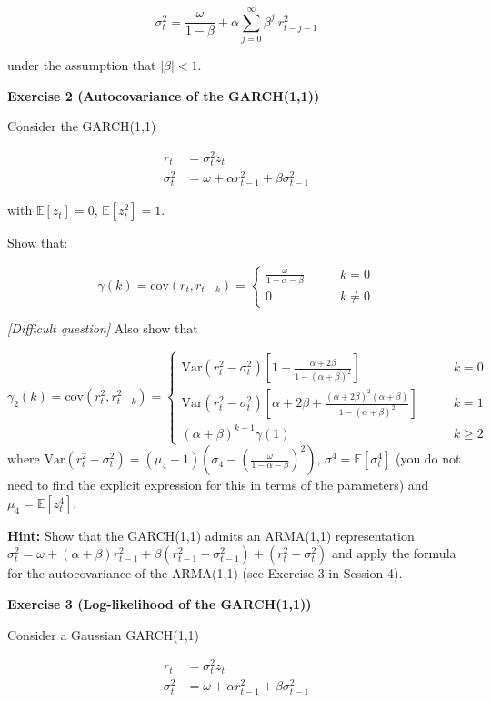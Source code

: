 \documentclass[
]{book}
\begin{document}
\[
\sigma^2_t = \frac{\omega}{1-\beta} + \alpha \sum_{j=0}^\infty \beta^j \ r^2_{t-j-1}
\]

under the assumption that \(|\beta| < 1\).

\textbf{Exercise 2 (Autocovariance of the GARCH(1,1))}

Consider the GARCH(1,1)

\[
\begin{aligned}
r_t &= \sigma^2_t z_t \\[1ex]
\sigma^2_t &= \omega + \alpha r_{t-1}^2 + \beta \sigma^2_{t-1}
\end{aligned}
\]

with \(\mathbb{E}[z_t] = 0\), \(\mathbb{E}[z^2_t] = 1\).

Show that:

\[
\gamma(k) = \text{cov}(r_t, r_{t-k}) = 
\begin{cases}
\frac{\omega}{1-\alpha-\beta}  \qquad  & k = 0 \\
0 & k \neq 0
\end{cases}
\]

\emph{{[}Difficult question{]}} Also show that

\[
\gamma_2(k) = \text{cov}(r^2_t, r^2_{t-k}) = 
\begin{cases}
\text{Var}(r^2_t - \sigma^2_t)\left[1+\frac{\alpha+2\beta}{1-(\alpha+\beta)^2}\right] \qquad  & k = 0 \\[1em]
\text{Var}(r^2_t - \sigma^2_t)\left[\alpha+2\beta+\frac{(\alpha+2\beta)^2 (\alpha+\beta)}{1-(\alpha+\beta)^2}\right] \qquad  & k = 1 \\[1em]
(\alpha+\beta)^{k-1}\gamma(1) & k \geq 2
\end{cases}
\]
where \(\text{Var}(r^2_t - \sigma^2_t) = (\mu_4 - 1)\left( \sigma_4 - \left(\frac{\omega}{1-\alpha-\beta}\right)^2 \right)\), \(\sigma^4 = \mathbb{E}[\sigma^4_t]\) (you do not need to find the explicit expression for this in terms of the parameters) and \(\mu_4 = \mathbb{E}[z_t^4]\).

\textbf{Hint:} Show that the GARCH(1,1) admits an ARMA(1,1) representation \(\sigma_t^2 = \omega + (\alpha+\beta)r^2_{t-1} + \beta(r^2_{t-1}-\sigma^2_{t-1}) + (r^2_{t}-\sigma^2_{t})\) and apply the formula for the autocovariance of the ARMA(1,1) (see Exercise 3 in Session 4).

\textbf{Exercise 3 (Log-likelihood of the GARCH(1,1))}

Consider a Gaussian GARCH(1,1)

\[
\begin{aligned}
r_t &= \sigma^2_t z_t \\[1ex]
\sigma^2_t &= \omega + \alpha r_{t-1}^2 + \beta \sigma^2_{t-1}
\end{aligned}
\]
\end{document}
